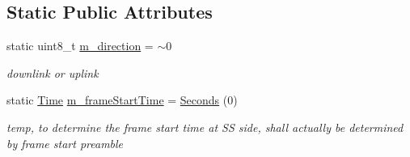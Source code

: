 \subsection*{Static Public Attributes}
\begin{DoxyCompactItemize}
\item 
static uint8\+\_\+t \hyperlink{classns3_1_1WimaxNetDevice_a13a7a35e7cdf58018029f0809a1701a9}{m\+\_\+direction} = $\sim$0
\begin{DoxyCompactList}\small\item\em downlink or uplink \end{DoxyCompactList}\item 
static \hyperlink{classns3_1_1Time}{Time} \hyperlink{classns3_1_1WimaxNetDevice_a63e934d6826d6343f1aadff35de1e294}{m\+\_\+frame\+Start\+Time} = \hyperlink{group__timecivil_ga33c34b816f8ff6628e33d5c8e9713b9e}{Seconds} (0)
\begin{DoxyCompactList}\small\item\em temp, to determine the frame start time at SS side, shall actually be determined by frame start preamble \end{DoxyCompactList}\end{DoxyCompactItemize}
